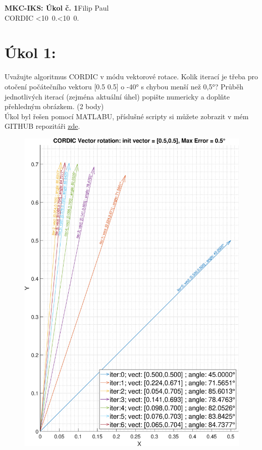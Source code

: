 \documentclass[10pt, a4paper]{article}%
\def\mydate{\leavevmode\hbox{\twodigits\day.\twodigits\month.\the\year}}
\def\twodigits#1{\ifnum#1<10 0\fi\the#1}
\begin{document}
\begin{flushleft}%
	\textbf{\Large{MKC-IKS: Úkol č. 1}}\hfill Filip Paul\\
	\large{CORDIC \hfill\mydate}
\end{flushleft}


	\section{\Large Úkol 1:}
		Uvažujte algoritmus CORDIC v módu vektorové rotace. Kolik iterací je třeba pro otočení počátečního vektoru [0.5  0.5]
		o -40° s chybou menší než 0,5°? Průběh jednotlivých iterací (zejména aktuální úhel) popište numericky a doplňte přehledným obrázkem. (2 body)\\
		Úkol byl řešen pomocí MATLABU, příslušné scripty si můžete zobrazit v mém GITHUB repozitáři 
		\href{https://github.com/FilipPaul/ctvrtak_letni_semestr/blob/main/MKC_REM/ukol_1_CORDIC/README.md}{\color{blue} zde}.
	\begin{figure}[ht!]
		\centering
		\includegraphics[height = 0.80\textheight]{CORDIC_vect_rot.eps}
		
	\end{figure}
	\clearpage
\end{document}
